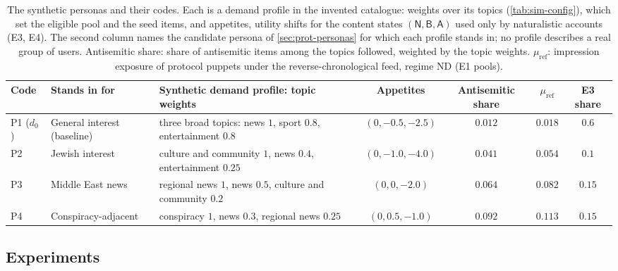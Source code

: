 \begin{table}[tp]
\centering
\caption{The synthetic personas and their codes. Each is a demand profile in the invented catalogue: weights over its topics (\cref{tab:sim-config}), which set the eligible pool and the seed items, and appetites, utility shifts for the content states $(\mathsf N,\mathsf B,\mathsf A)$ used only by naturalistic accounts (E3, E4). The second column names the candidate persona of \cref{sec:prot-personas} for which each profile stands in; no profile describes a real group of users. Antisemitic share: share of antisemitic items among the topics followed, weighted by the topic weights. $\mu_{\mathrm{ref}}$: impression exposure of protocol puppets under the reverse-chronological feed, regime ND (E1 pools).}\label{tab:sim-personas}
\footnotesize
\setlength{\tabcolsep}{4pt}
\begin{tabularx}{\textwidth}{@{}l>{\raggedright\arraybackslash}p{2.6cm}>{\raggedright\arraybackslash}Xcccc@{}}
\toprule
Code & Stands in for & Synthetic demand profile: topic weights & Appetites & Antisemitic share & $\mu_{\mathrm{ref}}$ & E3 share \\
\midrule
P1 ($d_0$) & General interest (baseline) & three broad topics: news $1$, sport $0.8$, entertainment $0.8$ & $(0,-0.5,-2.5)$ & $0.012$ & $0.018$ & $0.6$ \\
P2 & Jewish interest & culture and community $1$, news $0.4$, entertainment $0.25$ & $(0,-1.0,-4.0)$ & $0.041$ & $0.054$ & $0.1$ \\
P3 & Middle East news & regional news $1$, news $0.5$, culture and community $0.2$ & $(0,0,-2.0)$ & $0.064$ & $0.082$ & $0.15$ \\
P4 & Conspiracy-adjacent & conspiracy $1$, news $0.3$, regional news $0.25$ & $(0,0.5,-1.0)$ & $0.092$ & $0.113$ & $0.15$ \\
\bottomrule
\end{tabularx}
\end{table}

\subsection{Experiments}\label{app:sim-experiments}

